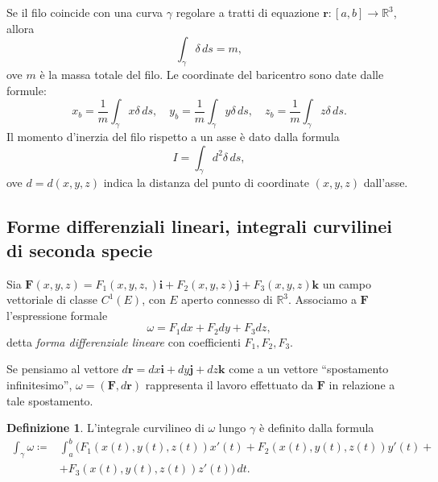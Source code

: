 \documentclass[a4paper]{book}
\numberwithin{equation}{section}
\theoremstyle{plain}
\theoremstyle{definition}
\newtheorem{defn}{Definizione}[section]
\theoremstyle{remark}
\renewcommand{\vec}{\boldsymbol}
\theoremstyle{example}
\begin{document}
Se il filo coincide con una curva $\gamma$ regolare a tratti di equazione $\vec{r} \colon\! [a, b] \to \mathbb{R}^3$, allora
	\begin{equation*}
	\int_{\gamma} \delta \, ds = m,
	\end{equation*}
ove $m$ è la massa totale del filo. Le coordinate del baricentro sono date dalle formule:
	\begin{equation}
	x_b = \frac{1}{m} \int_{\gamma}x\delta \, ds, \quad y_b = \frac{1}{m} \int_{\gamma} y\delta \, ds, \quad z_b = \frac{1}{m} \int_{\gamma} z\delta \, ds.
	\end{equation}
Il momento d'inerzia del filo rispetto a un asse è dato dalla formula
	\begin{equation}
	I = \int_{\gamma} d^2 \delta \, ds,
	\end{equation}
ove $d = d(x, y, z)$ indica la distanza del punto di coordinate $(x, y, z)$ dall'asse.

\subsection{Forme differenziali lineari, integrali curvilinei di seconda specie}
 Sia $\vec{F}(x, y, z) = F_1(x, y, z,)\vec{i} + F_2(x, y, z)\vec{j} + F_3(x, y, z)\vec{k}$ un campo vettoriale di classe $C^1(E)$, con $E$ aperto connesso di $\mathbb{R}^3$. Associamo a $\vec{F}$ l'espressione formale
 	\begin{equation}
 	\omega = F_1 dx + F_2dy + F_3dz,
 	\end{equation}
detta \emph{forma differenziale lineare} con coefficienti $F_1, F_2, F_3$.

Se pensiamo al vettore $d\vec{r} = dx\vec{i} + dy\vec{j} + dz\vec{k}$ come a un vettore ``spostamento infinitesimo'', $\omega = (\vec{F}, d\vec{r})$ rappresenta il lavoro effettuato da $\vec{F}$ in relazione a tale spostamento.

\begin{defn}
L'integrale curvilineo di $\omega$ lungo $\gamma$ è definito dalla formula
	\begin{equation}
	\begin{split}
	\label{eqn:intcurv2}
	\int_{\gamma}\omega \coloneqq &\int_a^b(F_1(x(t), y(t), z(t))x'(t) + F_2(x(t), y(t), z(t))y'(t)+  \\
	&+ F_3(x(t), y(t), z(t))z'(t))\, dt.
	\end{split}
	\end{equation}
\end{defn}
\end{document}
